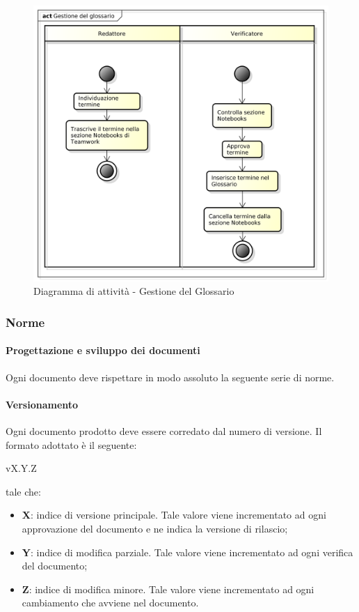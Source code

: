 \begin{figure}[htbp]
\centering
\includegraphics[scale=0.5]{immagini/gestione_glossario.png}
\captionsetup{labelfont=bf}
\caption{Diagramma di attività - Gestione del Glossario}\label{sec:Figura4}
\end{figure}

\subsubsection{Norme}
\paragraph{Progettazione e sviluppo dei documenti}
Ogni documento deve rispettare in modo assoluto la seguente serie di norme.

\paragraph{Versionamento}
\label{sec:versionamento}
Ogni documento prodotto deve essere corredato dal numero di versione. Il formato adottato è
il seguente:
\begin{center}
	vX.Y.Z
\end{center}
tale che:
\begin{itemize}
	\item{\textbf{X}}: indice di versione principale. Tale valore viene incrementato ad ogni approvazione del documento e ne indica la versione di rilascio;
	\item{\textbf{Y}}: indice di modifica parziale. Tale valore viene incrementato ad ogni verifica del documento;
	\item{\textbf{Z}}: indice di modifica minore. Tale valore viene incrementato ad ogni cambiamento che avviene nel documento.
\end{itemize}

